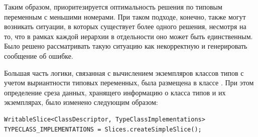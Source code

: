 Таким образом, приоритезируется оптимальность решения по типовым переменным с меньшими номерами. При таком подходе, конечно, также могут возникать ситуации, в которых существует более одного решения, несмотря на то, что в рамках каждой иерархии в отдельности оно может быть единственным. Было решено рассматривать такую ситуацию как некорректную и генерировать сообщение об ошибке. 

Большая часть логики, связанная с вычислением экземпляров классов типов с учетом выриантности типовых переменных, была размещена в классе . При этом определение среза данных, хранящего информацию о класса типов и их экземплярах, было изменено следующим образом:
\begin{lstlisting}[style={wo_caption}]
WritableSlice<ClassDescriptor, TypeClassImplementations> 
TYPECLASS_IMPLEMENTATIONS = Slices.createSimpleSlice();
\end{lstlisting}